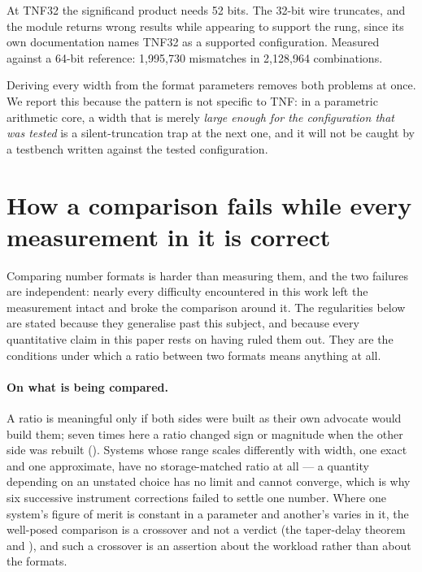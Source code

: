 At TNF32 the significand product needs 52 bits. The 32-bit wire truncates, and
the module returns wrong results while appearing to support the rung, since its
own documentation names TNF32 as a supported configuration. Measured against a
64-bit reference: 1{,}995{,}730 mismatches in 2{,}128{,}964 combinations.

Deriving every width from the format parameters removes both problems at once. We
report this because the pattern is not specific to TNF: in a parametric
arithmetic core, a width that is merely \emph{large enough for the configuration
that was tested} is a silent-truncation trap at the next one, and it will not be
caught by a testbench written against the tested configuration.


\section{How a comparison fails while every measurement in it is correct}
\label{sec:selfcheck}

Comparing number formats is harder than measuring them, and the two failures
are independent: nearly every difficulty encountered in this work left the
measurement intact and broke the comparison around it. The regularities below are
stated because they generalise past this subject, and because every quantitative
claim in this paper rests on having ruled them out. They are the conditions under
which a ratio between two formats means anything at all.

\paragraph{On what is being compared.} A ratio is meaningful only if both sides
were built as their own advocate would build them; seven times here a ratio
changed sign or magnitude when the other side was rebuilt
(). Systems whose range scales differently with
width, one exact and one approximate, have no storage-matched ratio at all --- a
quantity depending on an unstated choice has no limit and cannot converge, which
is why six successive instrument corrections failed to settle one number. Where
one system's figure of merit is constant in a parameter and another's varies in
it, the well-posed comparison is a crossover and not a verdict
(the taper-delay theorem and ), and such a
crossover is an assertion about the workload rather than about the formats.

